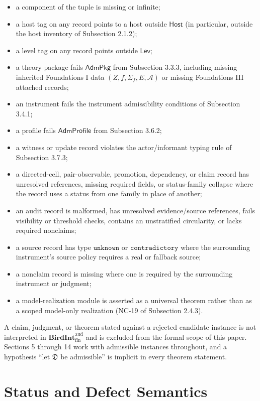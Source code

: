 \documentclass[11pt]{article}
\providecommand{\tightlist}{}
\theoremstyle{definition}
\begin{document}
\begin{itemize}
\tightlist
\item
  a component of the tuple is missing or infinite;
\item
  a host tag on any record points to a host outside \(\mathsf{Host}\) (in particular, outside the host inventory of Subsection 2.1.2);
\item
  a level tag on any record points outside \(\mathsf{Lev}\);
\item
  a theory package fails \(\mathsf{AdmPkg}\) from Subsection 3.3.3, including missing inherited Foundations I data \((Z,f,\Sigma_f,E,\mathcal A)\) or missing Foundations III attached records;
\item
  an instrument fails the instrument admissibility conditions of Subsection 3.4.1;
\item
  a profile fails \(\mathsf{AdmProfile}\) from Subsection 3.6.2;
\item
  a witness or update record violates the actor/informant typing rule of Subsection 3.7.3;
\item
  a directed-cell, pair-observable, promotion, dependency, or claim record has unresolved references, missing required fields, or status-family collapse where the record uses a status from one family in place of another;
\item
  an audit record is malformed, has unresolved evidence/source references, fails visibility or threshold checks, contains an unstratified circularity, or lacks required nonclaims;
\item
  a source record has type \(\texttt{unknown}\) or \(\texttt{contradictory}\) where the surrounding instrument's source policy requires a real or fallback source;
\item
  a nonclaim record is missing where one is required by the surrounding instrument or judgment;
\item
  a model-realization module is asserted as a universal theorem rather than as a scoped model-only realization (NC-19 of Subsection 2.4.3).
\end{itemize}

A claim, judgment, or theorem stated against a rejected candidate instance is not interpreted in \(\mathbf{BirdInt}^{\mathrm{aud}}_{\mathrm{fin}}\) and is excluded from the formal scope of this paper. Sections 5 through 14 work with admissible instances throughout, and a hypothesis ``let \(\mathfrak D\) be admissible'' is implicit in every theorem statement.
 \section{Status and Defect Semantics}
\end{document}
